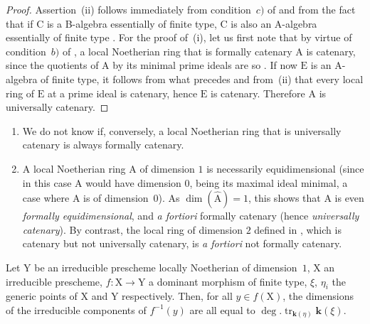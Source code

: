 \begin{proof}
Assertion~(ii) follows immediately from condition~$c)$ of  and from the fact that if $\mathrm{C}$ is a B-algebra essentially of finite type, $\mathrm{C}$ is also an A-algebra essentially of finite type .
For the proof of~(i), let us first note that by virtue of condition~$b)$ of , a local Noetherian ring that is formally catenary $\mathrm{A}$ is catenary, since the quotients of $\mathrm{A}$ by its minimal prime ideals are so .
If now $\mathrm{E}$ is an A-algebra of finite type, it follows from what precedes and from~(ii) that every local ring of $\mathrm{E}$ at a prime ideal is catenary, hence $\mathrm{E}$ is catenary.
Therefore $\mathrm{A}$ is universally catenary.
\end{proof}

\begin{remarks}[7.1.12]
\label{IV.7.1.12}
\begin{enumerate}[label=\emph{\roman*)}]
  \item We do not know if, conversely, a local Noetherian ring that is universally catenary is always formally catenary.

  \item A local Noetherian ring $\mathrm{A}$ of dimension $1$ is necessarily equidimensional (since in this case $\mathrm{A}$ would have dimension $0$, being its maximal ideal minimal, a case where $\mathrm{A}$ is of dimension~$0$).
  As $\dim(\widehat{\mathrm{A}})=1$, this shows that $\mathrm{A}$ is even \emph{formally equidimensional}, and \emph{a fortiori} formally catenary (hence \emph{universally catenary}).
  By contrast, the local ring of dimension $2$ defined in , which is catenary but not universally catenary, is \emph{a fortiori} not formally catenary.
\end{enumerate}
\end{remarks}


\begin{corollary}[7.1.13]
\label{IV.7.1.13}
Let $\mathrm{Y}$ be an irreducible prescheme locally Noetherian of dimension~$1$, $\mathrm{X}$ an irreducible prescheme, $f:\mathrm{X}\to\mathrm{Y}$ a dominant morphism of finite type, $\xi$, $\eta_i$ the generic points of $\mathrm{X}$ and $\mathrm{Y}$ respectively.
Then, for all $y\in f(\mathrm{X})$, the dimensions of the irreducible components of $f^{-1}(y)$ are all equal to $\deg.\operatorname{tr}_{\boldsymbol{k}(\eta)}\boldsymbol{k}(\xi)$.
\end{corollary}

